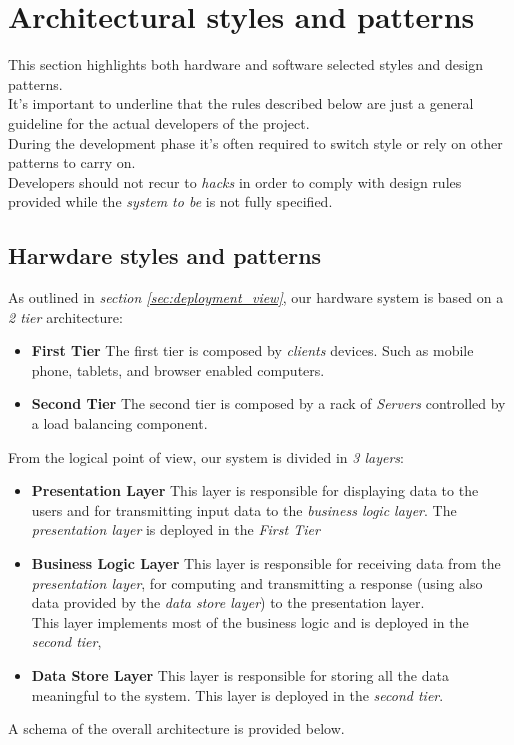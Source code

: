 \section{Architectural styles and patterns} %
\label{sec:architectural_styles_and_patterns_}
This section highlights both hardware and software selected styles and design patterns.\\
It's important to underline that the rules described below are just a general guideline for the actual developers of the project.\\
During the development phase it's often required to switch style or rely on other patterns to carry on.\\
Developers should not recur to \emph{hacks} in order to comply with design rules provided while the \emph{system to be} is not fully specified.
\subsection{Harwdare styles and patterns} %
\label{sub:harwdare_styles_and_patterns}
As outlined in \emph{section \ref{sec:deployment_view}}, our hardware system is based on a \emph{2 tier} architecture:
\begin{itemize}
	\item \textbf{First Tier} The first tier is composed by \emph{clients} devices. Such as mobile phone, tablets, and browser enabled computers.
	\item \textbf{Second Tier} The second tier is composed by a rack of \emph{Servers} controlled by a load balancing component.
\end{itemize}
From the logical point of view, our system is divided in \emph{3 layers}:
\begin{itemize}
	\item \textbf{Presentation Layer} This layer is responsible for displaying data to the users and for transmitting input data to the \emph{business logic layer}. The \emph{presentation layer} is deployed in the \emph{First Tier}
	\item \textbf{Business Logic Layer} This layer is responsible for receiving data from the \emph{presentation layer}, for computing and transmitting a response (using also data provided by the \emph{data store layer}) to the presentation layer.\\
	This layer implements most of the business logic and is deployed in the \emph{second tier},
	\item \textbf{Data Store Layer} This layer is responsible for storing all the data meaningful to the system. This layer is deployed in the \emph{second tier}.
\end{itemize}
A schema of the overall architecture is provided below.

